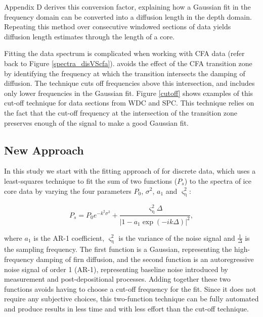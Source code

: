 \documentclass[draft, jgrga]{AGUTeX}
\begin{document}
\begin{article}
Appendix D derives this conversion factor, explaining how a Gaussian fit in the frequency domain can be converted into a diffusion length in the depth domain. Repeating this method over consecutive windowed sections of data yields diffusion length estimates through the length of a core.

Fitting the data spectrum is complicated when working with CFA data (refer back to Figure \ref{spectra_disVScfa}). \citet{Jones2017a} avoids the effect of the CFA transition zone by identifying the frequency at which the transition intersects the damping of diffusion. The technique cuts off frequencies above this intersection, and includes only lower frequencies in the Gaussian fit. Figure \ref{cutoff} shows examples of this cut-off technique for data sections from WDC and SPC. This technique relies on the fact that the cut-off frequency at the intersection of the transition zone preserves enough of the signal to make a good Gaussian fit.

\subsection{New Approach}
In this study we start with the fitting approach of \citet{Gkinis2014} for discrete data, which uses a least-squares technique to fit the sum of two functions ($P_s$) to the spectra of ice core data by varying the four parameters $P_0$, $\sigma^2$, $a_1$ and $\varsigma_{\mathrm{\eta}}^2$:

\begin{equation}
P_s =    P_0 {e}^{-k^2 \sigma^2} + \frac{\varsigma_{\mathrm{\eta}}^2 \Delta}
{\left| 1-a_1 \exp{\left( -i k  \Delta \right) } \right|^2},
\label{eq:powerspectrum}
\end{equation}

\noindent where $a_1$ is the AR-1 coefficient, $\varsigma_{\mathrm{\eta}}^2$ is the variance of the noise signal and $\frac{1}{\Delta}$ is the sampling frequency. The first function is a Gaussian, representing the high-frequency damping of firn diffusion, and the second function is an autoregressive noise signal of order 1 (AR-1), representing baseline noise introduced by measurement and post-depositional processes. Adding together these two functions avoids having to choose a cut-off frequency for the fit. Since it does not require any subjective choices, this two-function technique can be fully automated and produce results in less time and with less effort than the cut-off technique.


\end{article}
\end{document}
